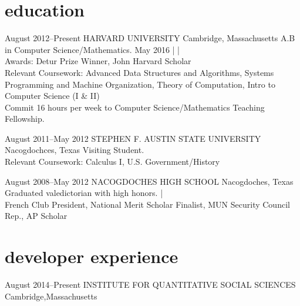 \documentclass[]{friggeri-cv} %
\begin{document}
\section{education}

\entry
{August 2012--Present}
{HARVARD UNIVERSITY}
{Cambridge, Massachusetts}
{A.B in Computer Science/Mathematics. 
May 2016 |
 | 
\\
Awards: Detur Prize Winner, John Harvard Scholar \\
Relevant Coursework: Advanced Data Structures and Algorithms,  Systems Programming and Machine Organization, Theory of Computation, Intro to Computer Science (I \& II)\\
Commit 16 hours per week to Computer Science/Mathematics Teaching Fellowship.\\
}
\begin{detailed}
\entry
{August 2011--May 2012}
{STEPHEN F. AUSTIN STATE UNIVERSITY}
{Nacogdochces, Texas}
{Visiting Student. \\
Relevant Coursework: Calculus I, U.S. Government/History \\
}
\end{detailed}
\entry
{August 2008--May 2012}
{NACOGDOCHES HIGH SCHOOL}
{Nacogdoches, Texas}
{Graduated valedictorian with high honors.  | \\
French Club President, National Merit Scholar Finalist, MUN Security Council Rep., AP Scholar}



\section{developer experience}

\entry
{August 2014--Present}
{INSTITUTE FOR QUANTITATIVE SOCIAL SCIENCES}
{Cambridge,Massachusetts}
{}
\end{document}
